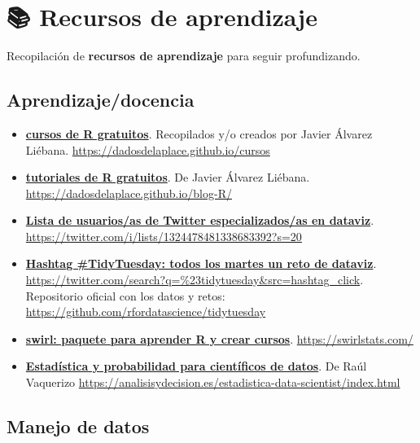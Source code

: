 \documentclass[11pt,]{book}
\begin{document}
\hypertarget{recursos-de-aprendizaje}{%
\chapter*{📚 Recursos de aprendizaje}\label{recursos-de-aprendizaje}}


Recopilación de \textbf{recursos de aprendizaje} para seguir profundizando.

\hypertarget{aprendizajedocencia}{%
\section*{Aprendizaje/docencia}\label{aprendizajedocencia}}


\begin{itemize}
\item
  \href{https://dadosdelaplace.github.io/cursos}{\textbf{cursos de R gratuitos}}. Recopilados y/o creados por Javier Álvarez Liébana. \url{https://dadosdelaplace.github.io/cursos}
\item
  \href{https://dadosdelaplace.github.io/blog-R/}{\textbf{tutoriales de R gratuitos}}. De Javier Álvarez Liébana. \url{https://dadosdelaplace.github.io/blog-R/}
\item
  \href{https://twitter.com/i/lists/1324478481338683392?s=20}{\textbf{Lista de usuarios/as de Twitter especializados/as en dataviz}}. \url{https://twitter.com/i/lists/1324478481338683392?s=20}
\item
  \href{https://twitter.com/search?q=\%23tidytuesday\&src=hashtag_click}{\textbf{Hashtag \#TidyTuesday: todos los martes un reto de dataviz}}. \url{https://twitter.com/search?q=\%23tidytuesday\&src=hashtag_click}. Repositorio oficial con los datos y retos: \url{https://github.com/rfordatascience/tidytuesday}
\item
  \href{https://swirlstats.com/}{\textbf{swirl: paquete para aprender R y crear cursos}}. \url{https://swirlstats.com/}
\item
  \href{https://analisisydecision.es/estadistica-data-scientist/index.html}{\textbf{Estadística y probabilidad para científicos de datos}}. De Raúl Vaquerizo \url{https://analisisydecision.es/estadistica-data-scientist/index.html}
\end{itemize}

\hypertarget{manejo-de-datos}{%
\section*{Manejo de datos}\label{manejo-de-datos}}
\end{document}
